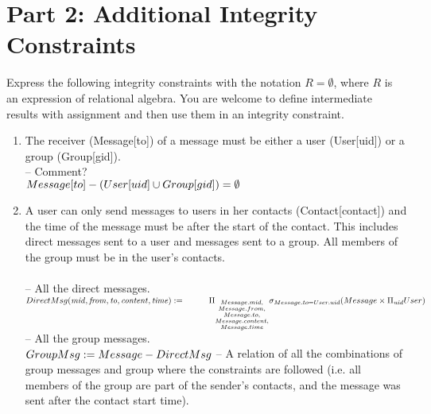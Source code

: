 \documentclass{article}
\newcommand{\var}[1]{\mathit{#1}}
\begin{document}
\section*{Part 2: Additional Integrity Constraints}


Express the following integrity constraints
with the notation $R = \emptyset$, where $R$ is an expression of relational algebra. 
You are welcome to define intermediate results with assignment
and then use them in an integrity constraint.

\begin{enumerate}

\item   %
The receiver (Message[to]) of a message must be either a user (User[uid]) or a group (Group[gid]). \\ [5pt]
\large{
\hspace*{1cm} -- Comment?\\ [5pt]
$
Message[to] - (User[uid] \cup Group[gid]) =  \emptyset \\[5pt]
$
}
\item %
A user can only send messages to users in her contacts (Contact[contact]) and the time of the message must be after the start of the contact. This includes direct messages sent to a user and messages sent to a group. All members of the group must be in the user's contacts. \\\\ [5pt]
\large{
\hspace*{1cm} -- All the direct messages. \\ [5pt]
$
DirectMsg(\var{mid}, \var{from}, \var{to}, \var{content}, \var{time}) := \\ [5pt]
\hspace*{1cm} \Pi_{\substack{Message.mid, \\
							Message.from, \\
							Message.to, \\
							Message.content, \\
							Message.time}}
			\sigma_{Message.to = User.uid}
			(Message \times \Pi_{\var{uid}} User) \\\\\\ [5pt]
$
\hspace*{1cm} -- All the group messages. \\ [5pt]
$
GroupMsg := Message - DirectMsg \\\\ [5pt]
$
\hspace*{1cm} -- A relation of all the combinations of group messages and group where the constraints are followed (i.e. all members of the group are part of the sender's contacts, and the message was sent after the contact start time). \\ [5pt]
}
\end{enumerate}
\end{document}
